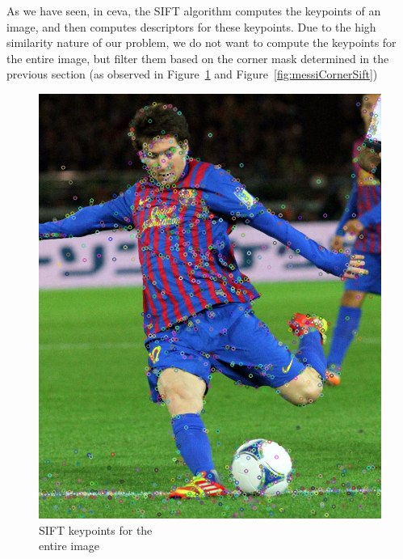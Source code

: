As we have seen, in ceva, the SIFT algorithm computes the keypoints of an image, and then computes descriptors for these keypoints. Due to the high similarity nature of our problem, we do not want to compute the keypoints for the entire image, but filter them based on the corner mask determined in the previous section (as observed in Figure~\ref{fig:messiSift} and Figure~\ref{fig:messiCornerSift})

\begin{figure}[ht!]
\centering
\begin{minipage}{.5\textwidth}
	\centering
	\includegraphics[width=.8\linewidth]{images/messiSift.png}
	\caption{SIFT keypoints for the\\ entire image}
	\label{fig:messiSift}
\end{minipage}%
\begin{minipage}{.5\textwidth}
	\centering

\end{minipage}
\end{figure}
